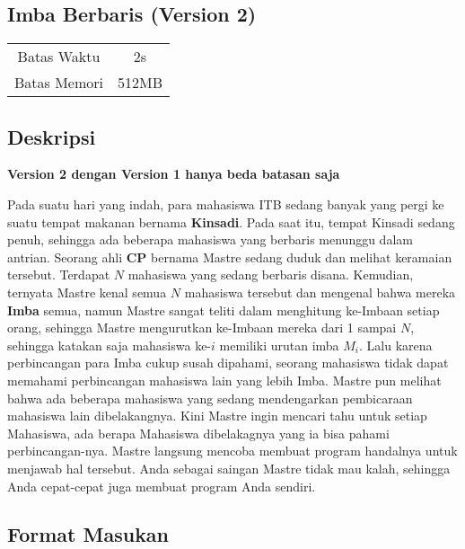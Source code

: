 \documentclass{article}
\begin{document}
\begin{center}
    \section*{Imba Berbaris (Version 2)} %

    \begin{tabular}{ | c c | }
        \hline
        Batas Waktu  & 2s \\    %
        Batas Memori & 512MB \\  %
        \hline
    \end{tabular}
\end{center}

\subsection*{Deskripsi}
\vspace{-\baselineskip}
\begin{center}
\textbf{Version 2 dengan Version 1 hanya beda batasan saja}
\end{center}
\vspace{-\baselineskip}
Pada suatu hari yang indah, para mahasiswa ITB sedang banyak yang pergi ke suatu tempat makanan bernama \textbf{Kinsadi}. Pada saat itu, tempat Kinsadi sedang penuh, sehingga ada beberapa mahasiswa yang berbaris menunggu dalam antrian. Seorang ahli \textbf{CP} bernama Mastre sedang duduk dan melihat keramaian tersebut. Terdapat $N$ mahasiswa yang sedang berbaris disana. Kemudian, ternyata Mastre kenal semua $N$ mahasiswa tersebut dan mengenal bahwa mereka \textbf{Imba} semua, namun Mastre sangat teliti dalam menghitung ke-Imbaan setiap orang, sehingga Mastre mengurutkan ke-Imbaan mereka dari 1 sampai $N$, sehingga katakan saja mahasiswa ke-$i$ memiliki urutan imba $M_i$. Lalu karena perbincangan para Imba cukup susah dipahami, seorang mahasiswa tidak dapat memahami perbincangan mahasiswa lain yang lebih Imba. Mastre pun melihat bahwa ada beberapa mahasiswa yang sedang mendengarkan pembicaraan mahasiswa lain dibelakangnya. Kini Mastre ingin mencari tahu untuk setiap Mahasiswa, ada berapa Mahasiswa dibelakagnya yang ia bisa pahami perbincangan-nya. Mastre langsung mencoba membuat program handalnya untuk menjawab hal tersebut. Anda sebagai saingan Mastre tidak mau kalah, sehingga Anda cepat-cepat juga membuat program Anda sendiri.

\subsection*{Format Masukan}
\end{document}
